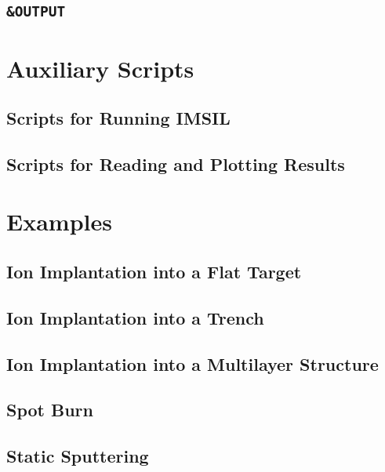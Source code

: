 \documentclass[twoside,12pt]{book}
\begin{document}
\section{\texttt{\&OUTPUT} ~}
\label{s:output}

%
%
\chapter{Auxiliary Scripts}
\label{k:scripts}

%
\section{Scripts for Running IMSIL}
\label{s:scripts_run}

%
\section{Scripts for Reading and Plotting Results}
\label{s:scripts_read}

%
%
\chapter{Examples}
\label{k:ex}
%
\section{Ion Implantation into a Flat Target}
\label{s:ex_impl1d}

%
\section{Ion Implantation into a Trench}


\section{Ion Implantation into a Multilayer Structure}


\section{Spot Burn}


\section{Static Sputtering}

\end{document}
